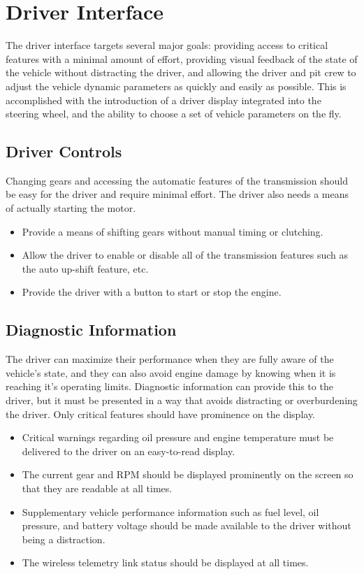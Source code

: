 \section{Driver Interface}

The driver interface targets several major goals: providing access to critical features with a minimal amount of effort, providing visual feedback of the state of the vehicle without distracting the driver, and allowing the driver and pit crew to adjust the vehicle dynamic parameters as quickly and easily as possible. This is accomplished with the introduction of a driver display integrated into the steering wheel, and the ability to choose a set of vehicle parameters on the fly.

\subsection{Driver Controls}

Changing gears and accessing the automatic features of the transmission should be easy for the driver and require minimal effort. The driver also needs a means of actually starting the motor.

\begin{itemize}
\item Provide a means of shifting gears without manual timing or clutching.
\item Allow the driver to enable or disable all of the transmission features such as the auto up-shift feature, etc.
\item Provide the driver with a button to start or stop the engine. 
\end{itemize}

\subsection{Diagnostic Information}

The driver can maximize their performance when they are fully aware of the vehicle's state, and they can also avoid engine damage by knowing when it is reaching it's operating limits. Diagnostic information can provide this to the driver, but it must be presented in a way that avoids distracting or overburdening the driver. Only critical features should have prominence on the display.

\begin{itemize}
\item Critical warnings regarding oil pressure and engine temperature must be delivered to the driver on an easy-to-read display.
\item The current gear and RPM should be displayed prominently on the screen so that they are readable at all times.
\item Supplementary vehicle performance information such as fuel level, oil pressure, and battery voltage should be made available to the driver without being a distraction.
\item The wireless telemetry link status should be displayed at all times.
\end{itemize}

